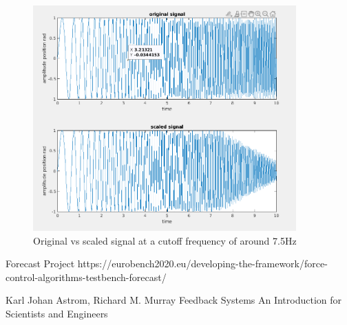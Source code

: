 \documentclass[a4paper,11pt]{article}
\begin{document}
\begin{figure}[H]
\begin{center}
\includegraphics[width=0.9\textwidth]{images/signal.png}
\end{center}
\caption{Original vs scaled signal at a cutoff frequency of around 7.5Hz}
\label{fig:signal}
\end{figure}
  

\begin{thebibliography}{9}

Forecast Project https://eurobench2020.eu/developing-the-framework/force-control-algorithms-testbench-forecast/

Karl Johan Astrom, Richard M. Murray Feedback Systems An Introduction for Scientists and Engineers
\end{thebibliography}
\end{document}
